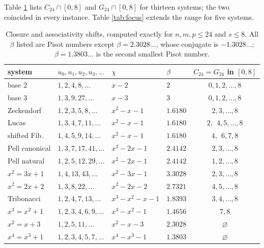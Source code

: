 \documentclass[11pt,reqno]{amsart}
\theoremstyle{plain}
\theoremstyle{definition}
\begin{document}
Table \ref{tab:main} lists $C_{24}\cap[0,8]$ and $G_{24}\cap[0,8]$ for thirteen systems; the two
coincided in every instance. Table \ref{tab:focus} extends the range for five systems.

\begin{table}[ht]
\centering
\small
\begin{tabular}{llllc}
\toprule
system & $u_{0},u_{1},u_{2},u_{3},\dots$ & $\chi$ & $\beta$ & $C_{24}=G_{24}$ in $[0,8]$\\
\midrule
base $2$        & $1,2,4,8,\dots$      & $x-2$        & $2$      & $0,1,2,\dots,8$\\
base $3$        & $1,3,9,27,\dots$     & $x-3$        & $3$      & $0,1,2,\dots,8$\\
Zeckendorf      & $1,2,3,5,8,\dots$    & $x^{2}-x-1$  & $1.6180$ & $2,3,\dots,8$\\
Lucas           & $1,3,4,7,11,\dots$   & $x^{2}-x-1$  & $1.6180$ & $2,\ \ 4,5,\dots,8$\\
shifted Fib.    & $1,4,5,9,14,\dots$   & $x^{2}-x-1$  & $1.6180$ & $4,\ \ 6,7,8$\\
Pell canonical  & $1,3,7,17,41,\dots$  & $x^{2}-2x-1$ & $2.4142$ & $2,3,\dots,8$\\
Pell natural    & $1,2,5,12,29,\dots$  & $x^{2}-2x-1$ & $2.4142$ & $1,2,\dots,8$\\
$x^{2}=3x+1$    & $1,4,13,43,\dots$    & $x^{2}-3x-1$ & $3.3028$ & $2,3,\dots,8$\\
$x^{2}=2x+2$    & $1,3,8,22,\dots$     & $x^{2}-2x-2$ & $2.7321$ & $4,5,\dots,8$\\
Tribonacci      & $1,2,4,7,13,\dots$   & $x^{3}-x^{2}-x-1$ & $1.8393$ & $3,4,\dots,8$\\
$x^{3}=x^{2}+1$ & $1,2,3,4,6,9,\dots$  & $x^{3}-x^{2}-1$   & $1.4656$ & $7,8$\\
$x^{2}=x+3$     & $1,2,5,11,\dots$     & $x^{2}-x-3$  & $2.3028$ & $\varnothing$\\
$x^{4}=x^{3}+1$ & $1,2,3,4,5,7,\dots$  & $x^{4}-x^{3}-1$ & $1.3803$ & $\varnothing$\\
\bottomrule
\end{tabular}
\medskip
\caption{Closure and associativity shifts, computed exactly for $n,m,p\le24$ and $s\le8$. All
$\beta$ listed are Pisot numbers except $\beta=2.3028\dots$, whose conjugate is $-1.3028\dots$;
$\beta=1.3803\dots$ is the second smallest Pisot number.}
\label{tab:main}
\end{table}
\end{document}
